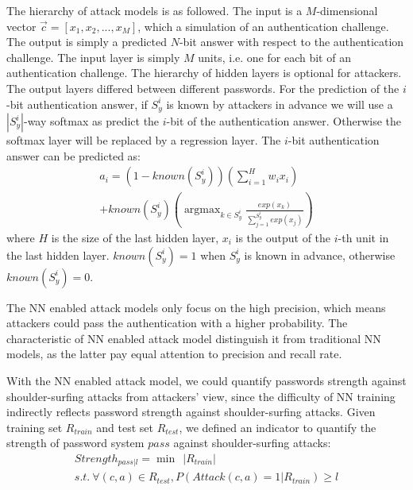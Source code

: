 \documentclass{article}
\begin{document}
  The hierarchy of attack models is as followed. The input is a $M$-dimensional vector 
  $\vec c = [x_1, x_2,...,x_M]$, which a simulation of an authentication challenge. The output is simply a 
  predicted $N$-bit answer with respect to the authentication challenge. The input layer is simply $M$ units, 
  i.e. one for each bit of an authentication challenge. The hierarchy of hidden layers is optional for 
  attackers. The output layers differed between different passwords. For the prediction of the $i$-bit authentication 
  answer, if $S_y^i$ is known by attackers in advance we will use a $|S_y^i|$-way softmax as predict the $i$-bit 
  of the authentication answer. Otherwise the softmax layer will be replaced by a regression layer. The $i$-bit 
  authentication answer can be predicted as:
  \begin{equation}
    \begin{gathered}
    a_i = (1-known(S_y^i))(\sum_{i=1}^H w_ix_i) \\
    + known(S_y^i)(\mathop{\arg\max}_{k \in S_y^i}\frac{exp(x_k)}{\sum_{j=1}^{S_y^i}exp(x_j)})
    \end{gathered}
  \end{equation}
  where $H$ is the size of the last hidden layer, $x_i$ is the output of the $i$-th unit in the last hidden layer. 
  $known(S_y^i) = 1$ when $S_y^i$ is known in advance, otherwise $known(S_y^i) = 0$.
  
  The NN enabled attack models only focus on the high precision, which means attackers could pass the authentication 
  with a higher probability. The characteristic of NN enabled attack model distinguish it from traditional 
  NN models, as the latter pay equal attention to precision and recall rate.
  
  With the NN enabled attack model, we could quantify passwords strength against shoulder-surfing attacks 
  from attackers' view, since the difficulty of NN training indirectly reflects password strength against 
  shoulder-surfing attacks.  Given training set $R_{train}$ and test set $R_{test}$, we defined an indicator 
  to quantify the strength of password system $pass$ against shoulder-surfing attacks:
  \begin{equation}
    \begin{gathered}
    Strength_{pass|l} = \mathop{\min}\ \ |R_{train}| \\
    s.t.\ 
    \forall (c,a) \in R_{test}, P(Attack(c,a)=1|R_{train}) \geq l
    \end{gathered}
  \label{equa:indictor}
  \end{equation}
  
\end{document}
